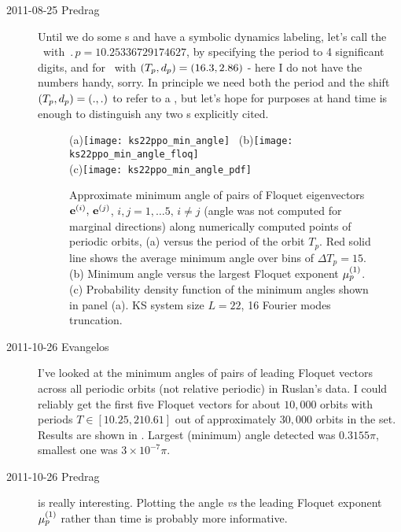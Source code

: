 \begin{description}
\item[2011-08-25 Predrag]
  Until we do some {\PoincSec s} and have a symbolic dynamics
  labeling, let's call  the \po\ with
  $\period{p}=10.25336729174627$, by specifying the period to 4 significant
  digits, and  for \rpo\ with
  $(\period{p},\shift_p)=(16.3,2.86)$ - here I do not have the numbers
  handy, sorry. In principle we need both the period and the shift
  $(\period{p},\shift_p)=(.,.)$ to refer to a \rpo, but let's hope for
  purposes at hand time is enough to distinguish any two \rpo s explicitly
  cited.

  \begin{figure}
    (a)\texttt{[image: ks22ppo\_min\_angle]}
    ~(b)\texttt{[image: ks22ppo\_min\_angle\_floq]}\\
    (c)\texttt{[image: ks22ppo\_min\_angle\_pdf]}
    \caption{
      Approximate minimum angle of pairs of Floquet eigenvectors
      $\jEigvec[i],\, \jEigvec[j]$, $i,j=1,\ldots 5,\, i\neq j$ (angle was not
      computed for marginal directions) along numerically computed points of
      periodic orbits, (a) versus the period of the orbit $T_p$. Red solid line
      shows the average minimum angle over bins of $\Delta T_p=15$. (b)
      Minimum angle versus the largest Floquet exponent $\eigRe[1]_p$.
      (c) Probability density function of the minimum angles shown in panel
      (a). KS system size $L=22$, 16 Fourier modes truncation.
    }
    \label{fig:ks22ppo_min_angle}
  \end{figure}


\item[2011-10-26 Evangelos]
  I've looked at the minimum angles of pairs of leading Floquet vectors
  across all periodic orbits (not relative periodic) in Ruslan's data. I
  could reliably get the first five Floquet vectors for about $10,000$
  orbits with periods $T\in[10.25, 210.61]$ out of approximately $30,000$
  orbits in the set. Results are shown in .
  Largest (minimum) angle detected was $0.3155\pi$, smallest one was
  $3\times10^{-7}\pi$.

\item[2011-10-26 Predrag]  is really
  interesting. Plotting the angle {\em vs} the leading Floquet exponent $\eigRe[1]_p$
  rather than time  is probably more informative.



\end{description}
